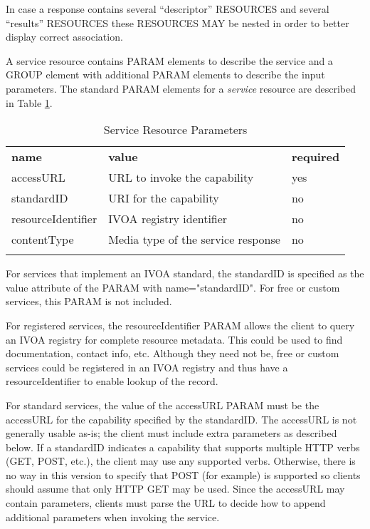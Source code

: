\documentclass[11pt,a4paper]{ivoa}
\newcommand{\attval}[2]{#1={\allowbreak}{"}#2{"}}
\begin{document}
In case a response contains several ``descriptor'' RESOURCES
and several ``results'' RESOURCES these RESOURCES MAY be nested in
order to better display correct association.

A service resource contains PARAM elements to describe the service and
a GROUP element with additional PARAM elements to describe the input
parameters.
The standard PARAM elements for a {\em service\/} resource
are described in Table \ref{tab:serviceParams}.
\begin{table}[h]
\begin{center}
\begin{tabular}{|l|l|l|}
\sptablerule
{\bf name}  &  {\bf value}  & {\bf required}  \\
\sptablerule
accessURL           & URL to invoke the capability   &  yes  \\
standardID          & URI for the capability         &  no   \\
resourceIdentifier  & IVOA registry identifier       &  no   \\
contentType	    & Media type of the service response & no \\
\sptablerule
\end{tabular}
\end{center}
\caption{Service Resource Parameters}
\label{tab:serviceParams}
\end{table}

For services that implement an IVOA standard, the standardID is specified
as the value attribute of the PARAM with \attval{name}{standardID}.
For free or custom services, this PARAM is not included.

For registered services, the resourceIdentifier PARAM allows the client
to query an IVOA registry for complete resource metadata. This could be
used to find documentation, contact info, etc. Although they need not be,
free or custom services could be registered in an IVOA registry and thus
have a resourceIdentifier to enable lookup of the record.

For standard services, the value of the accessURL PARAM must be the
accessURL for the capability specified by the standardID. The accessURL
is not generally usable as-is; the client must include extra parameters
as described below. If a standardID indicates a capability that supports
multiple HTTP verbs (GET, POST, etc.), the client may use any supported
verbs. Otherwise, there is no way in this version to specify that POST
(for example) is supported so clients should assume that only HTTP GET
may be used. Since the accessURL may contain parameters, clients must
parse the URL to decide how to append additional parameters when
invoking the service.
\end{document}

